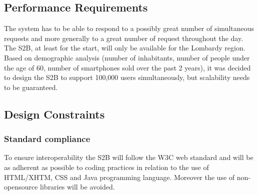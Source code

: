	\begin{enumerate}[resume, label={[R\arabic*]}]
		\item {}
		\item {}
	\end{enumerate}

	\begin{enumerate}[resume, label={[R\arabic*]}]
		\item {}
		\item {}
		\item {}
	\end{enumerate}
	
\subsection{Performance Requirements}
The system has to be able to respond to a possibly great number of simultaneous requests and
more generally to a great number of request throughout the day.
The S2B, at least for the start, will only be available for the Lombardy region. Based on demographic analysis (number of inhabitants, number of people under the age of 60, number of smartphones sold over the past 2 years), it was decided to design the S2B to support 100,000 users simultaneously, but scalability needs to be guaranteed.
\subsection{Design Constraints}
	\subsubsection{Standard compliance}
	To ensure interoperability the S2B will follow the W3C web standard and will be as adherent as possible to  coding practices in relation to the use of HTML/XHTM, CSS and Java programming language. Moreover the use of non-opensource libraries will be avoided.
